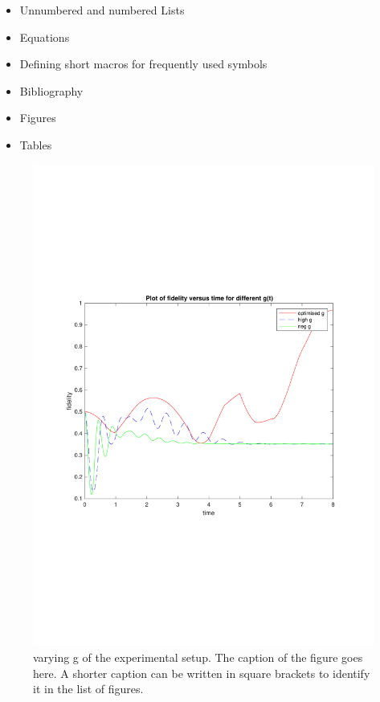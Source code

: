 \begin{itemize}
\item Unnumbered and numbered Lists
\item Equations
\item Defining short macros for frequently used symbols
\item Bibliography
\item Figures
\item Tables
\end{itemize}
\begin{figure}[tbp]
  \centering
    \includegraphics[width=1.0\textwidth]{gvary7}
    \caption[Process flow sheet]{varying g of the
      experimental setup. The caption of the figure goes here. A
      shorter caption can be written in square brackets to identify it
      in the list of figures.}
    \label{fig:gvary7} 
\end{figure}